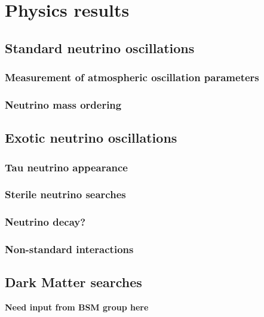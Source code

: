 \documentclass[../Main.tex]{subfiles}
\begin{document}
       {}       {}
    {}    {}
 {} {}


\graphicspath{{figures/}{Introduction/figures/}}


\section{Physics results}

\subsection{Standard neutrino oscillations}

\subsubsection{Measurement of atmospheric oscillation parameters}

\subsubsection{Neutrino mass ordering}

\subsection{Exotic neutrino oscillations}

\subsubsection{Tau neutrino appearance}

\subsubsection{Sterile neutrino searches}

\subsubsection{Neutrino decay?}

\subsubsection{Non-standard interactions}

\subsection{Dark Matter searches}

\textbf{Need input from BSM group here}
\end{document}
